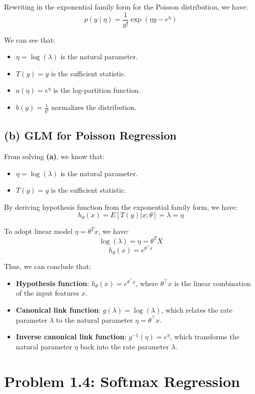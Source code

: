 \documentclass[12pt]{article}
\begin{document}
Rewriting in the exponential family form for the Poisson distribution, we have:
\[
p(y \mid \eta) = \frac{1}{y!} \exp\left( \eta y - e^{\eta} \right)
\]

We can see that:

\begin{itemize}
    \item \( \eta = \log(\lambda) \) is the natural parameter.
    \item \( T(y) = y \) is the sufficient statistic.
    \item \( a(\eta) = e^{\eta} \) is the log-partition function.
    \item \( b(y) = \frac{1}{y!} \) normalizes the distribution.
\end{itemize}

\subsection*{(b) GLM for Poisson Regression}
From solving \textbf{(a)}, we know that:  

\begin{itemize}
    \item \( \eta = \log(\lambda) \) is the natural parameter.
    \item \( T(y) = y \) is the sufficient statistic.
\end{itemize}

By deriving hypothesis function from the exponential family form, we have:
\[
h_\theta(x) = E[T(y)|x; \theta]= \lambda = \eta
\]

To adopt linear model \(\eta = \theta^T x\), we have:
\[
    \log (\lambda) = \eta = \theta^T X
\]
\[
    h_\theta(x) = e^{\theta^\top x}
\]

Thus, we can conclude that:
\begin{itemize}
    \item \textbf{Hypothesis function}: \( h_\theta(x) = e^{\theta^\top x} \), where \( \theta^\top x \) is the linear combination of the input features \( x \).
    \item \textbf{Canonical link function}: \( g(\lambda) = \log(\lambda) \), which relates the rate parameter \( \lambda \) to the natural parameter \( \eta = \theta^\top x \).
    \item \textbf{Inverse canonical link function}: \( g^{-1}(\eta) = e^{\eta} \), which transforms the natural parameter \( \eta \) back into the rate parameter \( \lambda \).
\end{itemize}

\section*{Problem 1.4: Softmax Regression}
\end{document}
